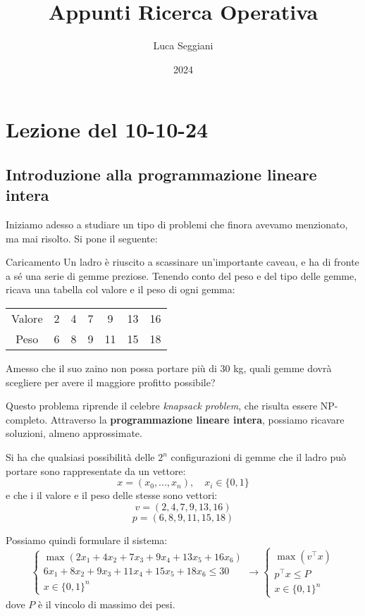 \documentclass[a4paper,11pt]{article}
\title{Appunti Ricerca Operativa}
\author{Luca Seggiani}
\date{2024}
\begin{document}
\section{Lezione del 10-10-24}

\thispagestyle{empty}
\pagestyle{fancy}

\subsection{Introduzione alla programmazione lineare intera}
Iniziamo adesso a studiare un tipo di problemi che finora avevamo menzionato, ma mai risolto.
Si pone il seguente:

\begin{problem}{Caricamento}
	Un ladro è riuscito a scassinare un'importante caveau, e ha di fronte a sé una serie di gemme preziose.
	Tenendo conto del peso e del tipo delle gemme, ricava una tabella col valore e il peso di ogni gemma:
	
	\center {}
	\begin{tabular} { | c || c | c | c | c | c| c |}
		\hline
		Valore & 2 & 4 & 7 & 9 & 13 & 16 \\
		Peso & 6 & 8 & 9 & 11 & 15 & 18 \\
		\hline
	\end{tabular}

	\par\bigskip

	\raggedright
	Amesso che il suo zaino non possa portare più di 30 kg, quali gemme dovrà scegliere per avere il maggiore profitto possibile?
\end{problem}

Questo problema riprende il celebre \textit{knapsack problem}, che risulta essere NP-completo.
Attraverso la \textbf{programmazione lineare intera}, possiamo ricavare soluzioni, almeno approssimate.

Si ha che qualsiasi possibilità delle $2^n$ configurazioni di gemme che il ladro può portare sono rappresentate da un vettore:
$$ 
x = (x_0, ..., x_n), \quad x_i \in \{ 0, 1 \}
$$
e che i il valore e il peso delle stesse sono vettori:
$$
v = \left( 2, 4, 7, 9, 13, 16 \right)
$$
$$
p = \left( 6, 8, 9, 11, 15, 18 \right)
$$

Possiamo quindi formulare il sistema:
\[
	\begin{cases}
		\max \left( 2x_1 + 4x_2 + 7x_3 + 9x_4 + 13x_5 + 16x_6 \right) \\ 
		6x_1 + 8x_2 + 9x_3 + 11x_4 + 15x_5 + 18x_6 \leq 30 \\
		x \in \{ 0, 1 \}^n
	\end{cases}
	\rightarrow
	\begin{cases}
		\max \left( v^\intercal x \right) \\
		p^\intercal x \leq P \\
		x \in \{ 0, 1 \}^n
	\end{cases}
\]
dove $P$ è il vincolo di massimo dei pesi.
\end{document}
